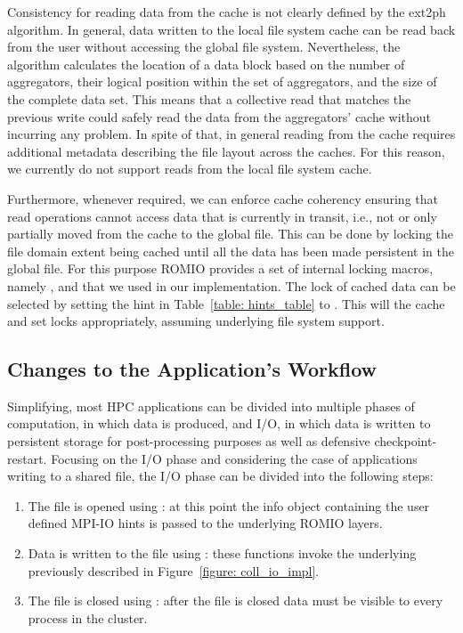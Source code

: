 Consistency for reading data from the cache is not clearly defined by the ext2ph algorithm. In general, data written to the local file system cache can be read back from the user without accessing the global file system. Nevertheless, the algorithm calculates the location of a data block based on the number of aggregators, their logical position within the set of aggregators, and the size of the complete data set. This means that a collective read that matches the previous write could safely read the data from the aggregators' cache without incurring any problem. In spite of that, in general reading from the cache requires additional metadata describing the file layout across the caches. For this reason, we currently do not support reads from the local file system cache.

Furthermore, whenever required, we can enforce cache coherency ensuring that read operations cannot access data that is currently in transit, i.e., not or only partially moved from the cache to the global file. This can be done by locking the file domain extent being cached until all the data has been made persistent in the global file. For this purpose ROMIO provides a set of internal locking macros, namely ,  and  that we used in our implementation. The lock of cached data can be selected by setting the  hint in Table~\ref{table: hints_table} to . This will  the cache and set locks appropriately, assuming underlying file system support.

\subsection{Changes to the Application's Workflow}
\label{subsec: new-workflow}
Simplifying, most HPC applications can be divided into multiple phases of computation, in which data is produced, and I/O, in which data is written to persistent storage for post-processing purposes as well as defensive checkpoint-restart. Focusing on the I/O phase and considering the case of applications writing to a shared file, the I/O phase can be divided into the following steps:
\begin{enumerate}
        \item The file is opened using : at this point the info object containing the user defined MPI-IO hints is passed to the underlying ROMIO layers.
        \item Data is written to the file using : these functions invoke the underlying  previously described in Figure~\ref{figure: coll_io_impl}.
        \item The file is closed using : after the file is closed data must be visible to every process in the cluster. 
\end{enumerate}

